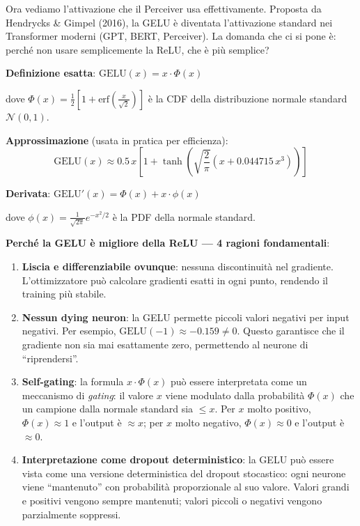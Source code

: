 \documentclass[12pt,a4paper]{article}
\begin{document}
Ora vediamo l'attivazione che il Perceiver usa effettivamente. Proposta da Hendrycks \& Gimpel (2016), la GELU \`e diventata l'attivazione standard nei Transformer moderni (GPT, BERT, Perceiver). La domanda che ci si pone \`e: perch\'e non usare semplicemente la ReLU, che \`e pi\`u semplice?

\begin{formulabox}
\textbf{Definizione esatta}: $\text{GELU}(x) = x \cdot \Phi(x)$

dove $\Phi(x) = \frac{1}{2}\left[1 + \text{erf}\!\left(\frac{x}{\sqrt{2}}\right)\right]$ \`e la CDF della distribuzione normale standard $\mathcal{N}(0,1)$.

\textbf{Approssimazione} (usata in pratica per efficienza):
\[
\text{GELU}(x) \approx 0.5\, x \left[1 + \tanh\!\left(\sqrt{\frac{2}{\pi}}\left(x + 0.044715\, x^3\right)\right)\right]
\]

\textbf{Derivata}: $\text{GELU}'(x) = \Phi(x) + x \cdot \phi(x)$

dove $\phi(x) = \frac{1}{\sqrt{2\pi}} e^{-x^2/2}$ \`e la PDF della normale standard.
\end{formulabox}

\textbf{Perch\'e la GELU \`e migliore della ReLU --- 4 ragioni fondamentali}:
\begin{enumerate}
    \item \textbf{Liscia e differenziabile ovunque}: nessuna discontinuit\`a nel gradiente. L'ottimizzatore pu\`o calcolare gradienti esatti in ogni punto, rendendo il training pi\`u stabile.
    \item \textbf{Nessun dying neuron}: la GELU permette piccoli valori negativi per input negativi. Per esempio, $\text{GELU}(-1) \approx -0.159 \neq 0$. Questo garantisce che il gradiente non sia mai esattamente zero, permettendo al neurone di ``riprendersi''.
    \item \textbf{Self-gating}: la formula $x \cdot \Phi(x)$ pu\`o essere interpretata come un meccanismo di \emph{gating}: il valore $x$ viene modulato dalla probabilit\`a $\Phi(x)$ che un campione dalla normale standard sia $\leq x$. Per $x$ molto positivo, $\Phi(x) \approx 1$ e l'output \`e $\approx x$; per $x$ molto negativo, $\Phi(x) \approx 0$ e l'output \`e $\approx 0$.
    \item \textbf{Interpretazione come dropout deterministico}: la GELU pu\`o essere vista come una versione deterministica del dropout stocastico: ogni neurone viene ``mantenuto'' con probabilit\`a proporzionale al suo valore. Valori grandi e positivi vengono sempre mantenuti; valori piccoli o negativi vengono parzialmente soppressi.
\end{enumerate}
\end{document}
